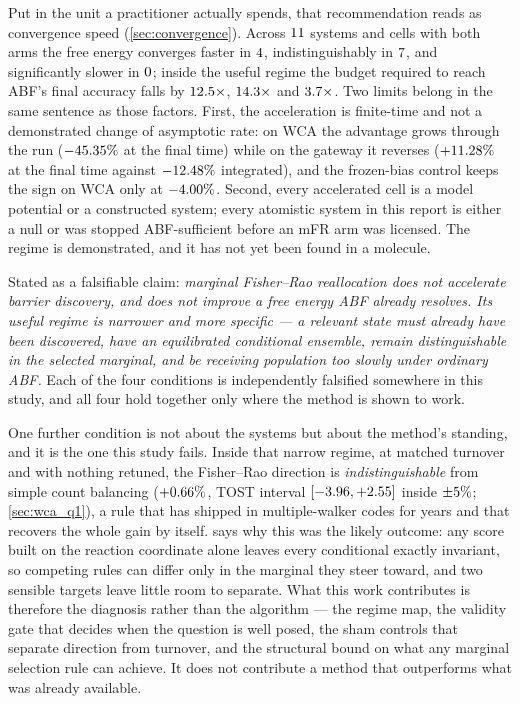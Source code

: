 Put in the unit a practitioner actually spends, that recommendation reads as convergence speed
(\cref{sec:convergence}). Across $11$ systems and cells with both arms the free energy
converges faster in $4$, indistinguishably in $7$, and significantly slower in
$0$; inside the useful regime the budget required to reach ABF's final accuracy falls
by $12.5\times$, $14.3\times$ and $3.7\times$. Two limits
belong in the same sentence as those factors. First, the acceleration is finite-time and not a
demonstrated change of asymptotic rate: on WCA the advantage grows through the run
($-45.35\%$ at the final time) while on the gateway it reverses ($+11.28\%$ at the
final time against $-12.48\%$ integrated), and the frozen-bias control keeps the sign on WCA
only at $-4.00\%$. Second, every accelerated cell is a model potential or a constructed
system; every atomistic system in this report is either a null or was stopped ABF-sufficient
before an mFR arm was licensed. The regime is demonstrated, and it has not yet been found in a
molecule.

Stated as a falsifiable claim: \emph{marginal Fisher--Rao reallocation does not accelerate
barrier discovery, and does not improve a free energy ABF already resolves. Its useful regime
is narrower and more specific --- a relevant state must already have been discovered, have an
equilibrated conditional ensemble, remain
distinguishable in the selected marginal, and be receiving population too slowly under
ordinary ABF.} Each of the four conditions is independently falsified somewhere in this
study, and all four hold together only where the method is shown to work.

One further condition is not about the systems but about the method's standing, and it is the
one this study fails. Inside that narrow regime, at matched turnover and with nothing retuned,
the Fisher--Rao direction is \emph{indistinguishable} from simple count balancing
($+0.66\%$, TOST interval $[-3.96, +2.55]$ inside
$\pm5\%$; \cref{sec:wca_q1}), a rule that has shipped in multiple-walker codes
for years and that recovers the whole gain by itself.  says why this
was the likely outcome: any score built on the reaction coordinate alone leaves every
conditional exactly invariant, so competing rules can differ only in the marginal they steer
toward, and two sensible targets leave little room to separate. What this work contributes is
therefore the diagnosis rather than the algorithm --- the regime map, the validity gate that
decides when the question is well posed, the sham controls that separate direction from
turnover, and the structural bound on what any marginal selection rule can achieve. It does
not contribute a method that outperforms what was already available.

